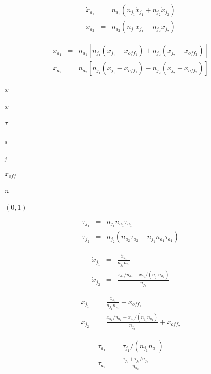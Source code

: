 \documentclass{article}
\begin{document}
\begin{eqnarray*}
\dot{x}_{a_1} & = & n_{a_1} ( n_{j_1} \dot{x}_{j_1} + n_{j_2} \dot{x}_{j_2} ) \\[2.5em]
\dot{x}_{a_2} & = & n_{a_2} ( n_{j_1} \dot{x}_{j_1} - n_{j_2} \dot{x}_{j_2} )
\end{eqnarray*}
\pagebreak

\begin{eqnarray*}
x_{a_1} & = & n_{a_1} \left[ n_{j_1} (x_{j_1} - x_{off_1}) + n_{j_2} (x_{j_2} - x_{off_2}) \right] \\[2.5em]
x_{a_2} & = & n_{a_2} \left[ n_{j_1} (x_{j_1} - x_{off_1}) - n_{j_2} (x_{j_2} - x_{off_2}) \right]
\end{eqnarray*}
\pagebreak

$ x $
\pagebreak

$ \dot{x} $
\pagebreak

$ \tau $
\pagebreak

$ _a $
\pagebreak

$ _j $
\pagebreak

$ x_{off}$
\pagebreak

$ n $
\pagebreak

$ (0, 1) $
\pagebreak

\begin{eqnarray*}
\tau_{j_1} & = & n_{j_1} n_{a_1} \tau_{a_1} \\
\tau_{j_2} & = & n_{j_2} (n_{a_2} \tau_{a_2} - n_{j_1} n_{a_1} \tau_{a_1})
\end{eqnarray*}
\pagebreak

\begin{eqnarray*}
\dot{x}_{j_1} & = & \frac{ \dot{x}_{a_1} }{ n_{j_1} n_{a_1} } \\
\dot{x}_{j_2} & = & \frac{ \dot{x}_{a_2} / n_{a_2} - \dot{x}_{a_1} / (n_{j_1} n_{a_1}) }{ n_{j_2} }
\end{eqnarray*}
\pagebreak

\begin{eqnarray*}
x_{j_1} & = & \frac{ x_{a_1} }{ n_{j_1} n_{a_1} } + x_{off_1} \\
x_{j_2} & = & \frac{ x_{a_2} / n_{a_2} - x_{a_1} / (n_{j_1} n_{a_1}) }{ n_{j_2} } + x_{off_2}
\end{eqnarray*}
\pagebreak

\begin{eqnarray*}
\tau_{a_1} & = & \tau_{j_1} / (n_{j_1} n_{a_1}) \\
\tau_{a_2} & = & \frac{ \tau_{j_1} + \tau_{j_2} / n_{j_2} }{ n_{a_2} }
\end{eqnarray*}
\pagebreak
\end{document}
